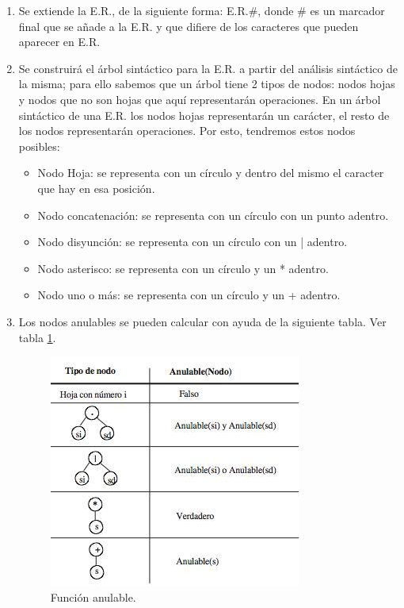 \documentclass{report}
\begin{document}
\begin{enumerate}
	\item Se extiende la E.R., de la siguiente forma: E.R.\#, donde \# es un marcador final que se añade a la E.R. y que difiere de los caracteres que pueden aparecer en E.R.
	\item Se construirá el árbol sintáctico para la E.R. a partir del análisis sintáctico de la misma; para ello sabemos que un árbol tiene 2 tipos de nodos: nodos hojas y nodos que no son hojas que aquí representarán operaciones. En un árbol sintáctico de una E.R. los nodos hojas representarán un carácter, el resto de los nodos representarán operaciones. Por esto, tendremos estos nodos posibles:
	\begin{itemize}
		\item Nodo Hoja: se representa con un círculo y dentro del mismo el caracter que hay en esa posición.
		\item Nodo concatenación: se representa con un círculo con un punto adentro.
		\item Nodo disyunción: se representa con un círculo con un | adentro.
		\item Nodo asterisco: se representa con un círculo y un * adentro.
		\item Nodo uno o más: se representa con un círculo y un + adentro.
	\end {itemize}
	\item Los nodos anulables se pueden calcular con ayuda de la siguiente tabla. Ver tabla \ref{fig:anulable}.

	\begin{figure}
		\centering
		\includegraphics[scale=.5]{img/tabla1.jpg}
		\caption{Función anulable.}
		\label{fig:anulable}
	\end{figure}


\end{enumerate}
\end{document}
